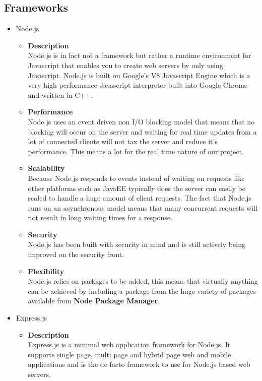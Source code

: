 \documentclass[11pt,fleqn]{book} %
\begin{document}
	\subsection{Frameworks}
	\begin{itemize}
		\item Node.js
		\begin{itemize}
			\item \textbf{Description}\\
			Node.js is in fact not a framework but rather a runtime environment for Javascript that enables you to create web servers by only using Javascript. Node.js is built on Google’s V8 Javascript Engine which is a very high performance Javascript interpreter built into Google Chrome and written in C++.
			\item \textbf{Performance}\\
			Node.js uses an event driven non I/O blocking model that means that no blocking will occur on the server and waiting for real time updates from a lot of connected clients will not tax the server and reduce it’s performance. This means a lot for the real time nature of our project.
			\item \textbf{Scalability}\\
			Because Node.js responds to events instead of waiting on requests like other platforms such as JavaEE typically does the server can easily be scaled to handle a huge amount of client requests. The fact that Node.js runs on an asynchronous model means that many concurrent requests will not result in long waiting times for a response.
			\item \textbf{Security}\\
			Node.js has been built with security in mind and is still actively being improved on the security front.
			\item \textbf{Flexibility}\\
			Node.js relies on packages to be added, this means that virtually anything can be achieved by including a package from the huge variety of packages available from \textbf{Node Package Manager}.	
		\end{itemize}
		\item Express.js
		\begin{itemize}
			\item \textbf{Description}\\
			Express.js is a minimal web application framework for Node.js. It supports single page, multi page and hybrid page web and mobile applications and is the de facto framework to use for Node.js based web servers.

\end{itemize}
\end{itemize}
\end{document}
